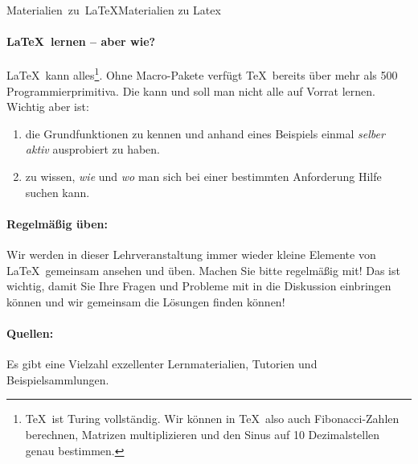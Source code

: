 

\unit{Materialien zu \LaTeX}{Materialien zu Latex}

\paragraph{\LaTeX\ lernen -- aber wie?}
\LaTeX\ kann alles\footnote{\TeX\ ist Turing vollständig. Wir können in \TeX\ also auch Fibonacci-Zahlen berechnen,
Matrizen multiplizieren und den Sinus auf 10 Dezimalstellen genau bestimmen.}. Ohne Macro-Pakete verfügt \TeX\
bereits über mehr als 500 Programmierprimitiva. Die kann und soll man nicht
alle auf Vorrat lernen. Wichtig aber ist:

\begin{enumerate}
\item die Grundfunktionen zu kennen und anhand eines Beispiels einmal \textit{selber aktiv} ausprobiert zu haben.
\item zu wissen, \textit{wie} und \textit{wo} man sich bei einer bestimmten Anforderung Hilfe suchen kann.
\end{enumerate}

\paragraph{Regelmäßig üben:}
Wir werden in dieser Lehrveranstaltung immer wieder kleine Elemente von \LaTeX\ gemeinsam ansehen und üben.
Machen Sie bitte regelmäßig mit! Das ist wichtig, damit Sie Ihre Fragen und Probleme mit in die Diskussion
einbringen können und wir gemeinsam die Lösungen finden können!

\paragraph{Quellen:} Es gibt eine Vielzahl exzellenter Lernmaterialien, Tutorien und Beispielsammlungen.

